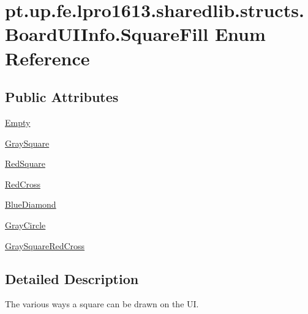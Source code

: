 \hypertarget{enumpt_1_1up_1_1fe_1_1lpro1613_1_1sharedlib_1_1structs_1_1_board_u_i_info_1_1_square_fill}{}\section{pt.\+up.\+fe.\+lpro1613.\+sharedlib.\+structs.\+Board\+U\+I\+Info.\+Square\+Fill Enum Reference}
\label{enumpt_1_1up_1_1fe_1_1lpro1613_1_1sharedlib_1_1structs_1_1_board_u_i_info_1_1_square_fill}
\subsection*{Public Attributes}
\begin{DoxyCompactItemize}
\item 
\hyperlink{enumpt_1_1up_1_1fe_1_1lpro1613_1_1sharedlib_1_1structs_1_1_board_u_i_info_1_1_square_fill_aa0edda009450224fb980df8b8f028717}{Empty}
\item 
\hyperlink{enumpt_1_1up_1_1fe_1_1lpro1613_1_1sharedlib_1_1structs_1_1_board_u_i_info_1_1_square_fill_a1046fab7e3c32ec39a152a6e711fc074}{Gray\+Square}
\item 
\hyperlink{enumpt_1_1up_1_1fe_1_1lpro1613_1_1sharedlib_1_1structs_1_1_board_u_i_info_1_1_square_fill_a6568ee584324dee1b120ff7069899ac5}{Red\+Square}
\item 
\hyperlink{enumpt_1_1up_1_1fe_1_1lpro1613_1_1sharedlib_1_1structs_1_1_board_u_i_info_1_1_square_fill_a60800ca7444666881227733f477b3294}{Red\+Cross}
\item 
\hyperlink{enumpt_1_1up_1_1fe_1_1lpro1613_1_1sharedlib_1_1structs_1_1_board_u_i_info_1_1_square_fill_a4e9d82f847bc440a974360f16cc0c0dd}{Blue\+Diamond}
\item 
\hyperlink{enumpt_1_1up_1_1fe_1_1lpro1613_1_1sharedlib_1_1structs_1_1_board_u_i_info_1_1_square_fill_a56b387cf3c5333edd5097142b8952db9}{Gray\+Circle}
\item 
\hyperlink{enumpt_1_1up_1_1fe_1_1lpro1613_1_1sharedlib_1_1structs_1_1_board_u_i_info_1_1_square_fill_a73ec5ffbc04f58be7c549b582f9cc574}{Gray\+Square\+Red\+Cross}
\end{DoxyCompactItemize}


\subsection{Detailed Description}
The various ways a square can be drawn on the UI. 

